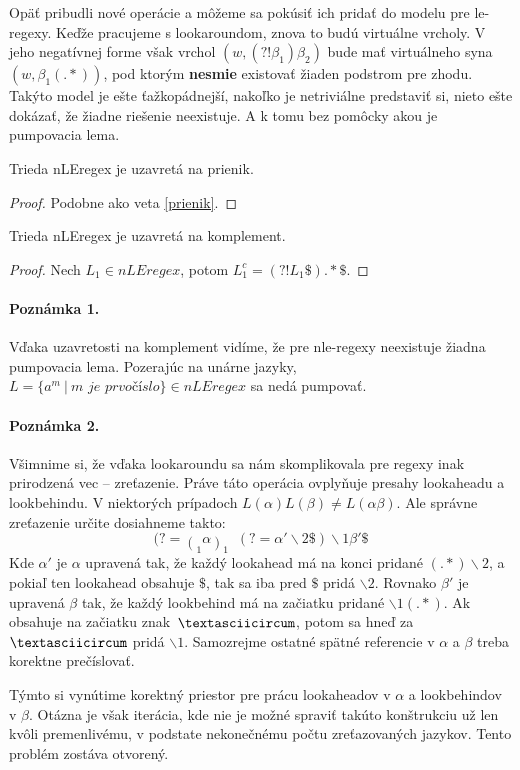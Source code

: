 Opäť pribudli nové operácie a môžeme sa pokúsiť ich pridať do modelu pre le-regexy. Keďže pracujeme s lookaroundom, znova to budú virtuálne vrcholy. V jeho negatívnej forme však vrchol $(w,(?!\beta_1)\beta_2)$ bude mať virtuálneho syna $(w, \beta_1(.*))$, pod ktorým \textbf{nesmie} existovať žiaden podstrom pre zhodu. Takýto model je ešte ťažkopádnejší, nakoľko je netriviálne predstaviť si, nieto ešte dokázať, že žiadne riešenie neexistuje. A k tomu bez pomôcky akou je pumpovacia lema.

\begin{veta}
Trieda nLEregex je uzavretá na prienik.
\end{veta}
\begin{proof}
Podobne ako veta \ref{prienik}.
\end{proof}

\begin{veta}
Trieda nLEregex je uzavretá na komplement.
\end{veta}
\begin{proof}
Nech $L_1 \in nLEregex$, potom $L_1^c  = \left( ?! L_1 \mathdollar \right) .* \mathdollar $.
\end{proof}

\paragraph{Poznámka 1.}
Vďaka uzavretosti na komplement vidíme, že pre nle-regexy neexistuje žiadna pumpovacia lema. Pozerajúc na unárne jazyky, $L = \lbrace a^m ~|~ m\textit{~je~prvočíslo}\rbrace \in nLEregex$ sa nedá pumpovať.

\paragraph{Poznámka 2.}
Všimnime si, že vďaka lookaroundu sa nám skomplikovala pre regexy inak prirodzená vec -- zreťazenie. Práve táto operácia ovplyňuje presahy lookaheadu a lookbehindu. V niektorých prípadoch $L(\alpha)L(\beta) \neq L(\alpha\beta)$. Ale správne zreťazenie určite do\-siah\-ne\-me takto:
$$ (?=\mathop(_1\alpha\mathop)_1 \mathop(_2\beta\mathop)_2 \mathdollar) (?=\alpha ' \backslash 2 \mathdollar) \backslash 1 \beta '  \mathdollar$$
Kde $\alpha '$ je $\alpha$ upravená tak, že každý lookahead má na konci pridané $(.*)\backslash 2$, a pokiaľ ten lookahead obsahuje $\mathdollar$, tak sa iba pred $\mathdollar$ pridá $\backslash 2$. Rovnako $\beta '$ je upravená $\beta$ tak, že každý lookbehind má na začiatku pridané $\backslash 1 (.*)$. Ak obsahuje na začiatku znak~$\textasciicircum$, potom sa hneď za $\textasciicircum$ pridá $\backslash 1$. Samozrejme ostatné spätné referencie v $\alpha$ a $\beta$ treba korektne prečíslovať.

Týmto si vynútime korektný priestor pre prácu lookaheadov v $\alpha$ a lookbehindov v $\beta$. Otázna je však iterácia, kde nie je možné spraviť takúto konštrukciu už len kvôli premenlivému, v podstate nekonečnému počtu zreťazovaných jazykov. Tento problém zostáva otvorený.
